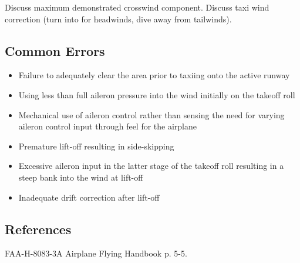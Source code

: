 Discuss maximum demonstrated crosswind component. Discuss taxi wind correction
(turn into for headwinds, dive away from tailwinds).

\subsection{Common Errors}

\begin{itemize}
  \item Failure to adequately clear the area prior to taxiing onto the active
    runway
  \item Using less than full aileron pressure into the wind initially on the
    takeoff roll
  \item Mechanical use of aileron control rather than sensing the need for
    varying aileron control input through feel for the airplane
  \item Premature lift-off resulting in side-skipping
  \item Excessive aileron input in the latter stage of the takeoff roll
    resulting in a steep bank into the wind at lift-off
  \item Inadequate drift correction after lift-off
\end{itemize}

\subsection{References}

FAA-H-8083-3A Airplane Flying Handbook p. 5-5.

